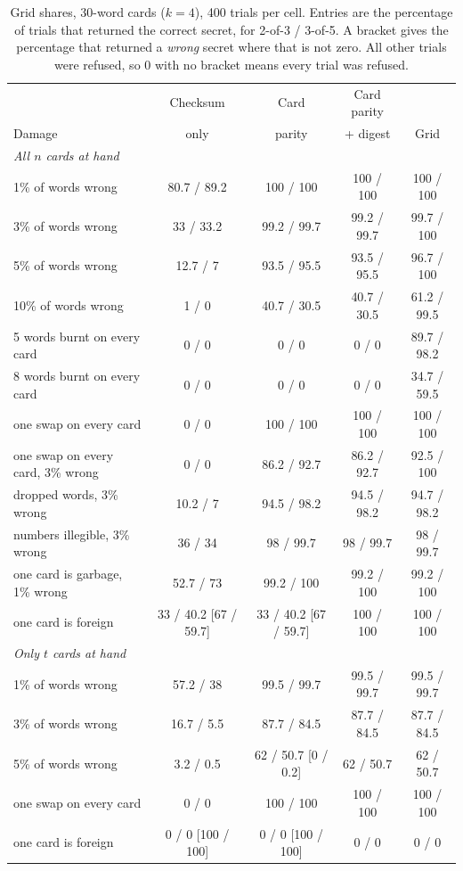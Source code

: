 \documentclass[numeric]{anvil-paper}
\begin{document}
\begin{table}[tb]
\centering
\caption{Grid shares, 30-word cards ($k=4$), 400 trials per cell. Entries are
the percentage of trials that returned the correct secret, for 2-of-3 / 3-of-5.
A bracket gives the percentage that returned a \emph{wrong} secret where that
is not zero. All other trials were refused, so 0 with no bracket means every
trial was refused.}
\label{tab:grid}
\small
\setlength{\tabcolsep}{4pt}
\begin{tabular}{lcccc}
\toprule
 & Checksum & Card & Card parity & \\
Damage & only & parity & + digest & Grid \\
\midrule
\multicolumn{5}{l}{\emph{All $n$ cards at hand}}\\
1\% of words wrong & 80.7 / 89.2 & 100 / 100 & 100 / 100 & 100 / 100 \\
3\% of words wrong & 33 / 33.2 & 99.2 / 99.7 & 99.2 / 99.7 & 99.7 / 100 \\
5\% of words wrong & 12.7 / 7 & 93.5 / 95.5 & 93.5 / 95.5 & 96.7 / 100 \\
10\% of words wrong & 1 / 0 & 40.7 / 30.5 & 40.7 / 30.5 & 61.2 / 99.5 \\
5 words burnt on every card & 0 / 0 & 0 / 0 & 0 / 0 & 89.7 / 98.2 \\
8 words burnt on every card & 0 / 0 & 0 / 0 & 0 / 0 & 34.7 / 59.5 \\
one swap on every card & 0 / 0 & 100 / 100 & 100 / 100 & 100 / 100 \\
one swap on every card, 3\% wrong & 0 / 0 & 86.2 / 92.7 & 86.2 / 92.7 & 92.5 / 100 \\
dropped words, 3\% wrong & 10.2 / 7 & 94.5 / 98.2 & 94.5 / 98.2 & 94.7 / 98.2 \\
numbers illegible, 3\% wrong & 36 / 34 & 98 / 99.7 & 98 / 99.7 & 98 / 99.7 \\
one card is garbage, 1\% wrong & 52.7 / 73 & 99.2 / 100 & 99.2 / 100 & 99.2 / 100 \\
one card is foreign & 33 / 40.2 [67 / 59.7] & 33 / 40.2 [67 / 59.7] & 100 / 100 & 100 / 100 \\
\midrule
\multicolumn{5}{l}{\emph{Only $t$ cards at hand}}\\
1\% of words wrong & 57.2 / 38 & 99.5 / 99.7 & 99.5 / 99.7 & 99.5 / 99.7 \\
3\% of words wrong & 16.7 / 5.5 & 87.7 / 84.5 & 87.7 / 84.5 & 87.7 / 84.5 \\
5\% of words wrong & 3.2 / 0.5 & 62 / 50.7 [0 / 0.2] & 62 / 50.7 & 62 / 50.7 \\
one swap on every card & 0 / 0 & 100 / 100 & 100 / 100 & 100 / 100 \\
one card is foreign & 0 / 0 [100 / 100] & 0 / 0 [100 / 100] & 0 / 0 & 0 / 0 \\
\bottomrule
\end{tabular}
\end{table}
\end{document}

